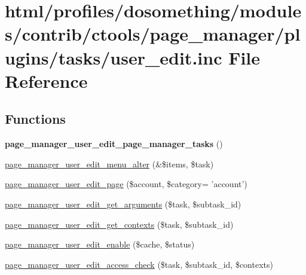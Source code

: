 \hypertarget{page__manager_2plugins_2tasks_2user__edit_8inc}{
\section{html/profiles/dosomething/modules/contrib/ctools/page\_\-manager/plugins/tasks/user\_\-edit.inc File Reference}
\label{page__manager_2plugins_2tasks_2user__edit_8inc}
}
\subsection*{Functions}
\begin{DoxyCompactItemize}
\item 
\hypertarget{page__manager_2plugins_2tasks_2user__edit_8inc_a8797d6dc72d52669429c95da19e760a6}{
{\bfseries page\_\-manager\_\-user\_\-edit\_\-page\_\-manager\_\-tasks} ()}
\label{page__manager_2plugins_2tasks_2user__edit_8inc_a8797d6dc72d52669429c95da19e760a6}

\item 
\hyperlink{page__manager_2plugins_2tasks_2user__edit_8inc_a46396f0acbd06ad364b85eeb374fbf84}{page\_\-manager\_\-user\_\-edit\_\-menu\_\-alter} (\&\$items, \$task)
\item 
\hyperlink{page__manager_2plugins_2tasks_2user__edit_8inc_abbda6f20e41f20d21543a539cbdb907f}{page\_\-manager\_\-user\_\-edit\_\-page} (\$account, \$category= 'account')
\item 
\hyperlink{page__manager_2plugins_2tasks_2user__edit_8inc_a3df388f9ce4f5d83b302a54261a83e8f}{page\_\-manager\_\-user\_\-edit\_\-get\_\-arguments} (\$task, \$subtask\_\-id)
\item 
\hyperlink{page__manager_2plugins_2tasks_2user__edit_8inc_a3c42b9d145a377d9575194d0bfb10851}{page\_\-manager\_\-user\_\-edit\_\-get\_\-contexts} (\$task, \$subtask\_\-id)
\item 
\hyperlink{page__manager_2plugins_2tasks_2user__edit_8inc_ac1cbd172da63121ed916e9923d27882a}{page\_\-manager\_\-user\_\-edit\_\-enable} (\$cache, \$status)
\item 
\hyperlink{page__manager_2plugins_2tasks_2user__edit_8inc_ab50a9d4e709806fca20037b4ef199fa3}{page\_\-manager\_\-user\_\-edit\_\-access\_\-check} (\$task, \$subtask\_\-id, \$contexts)
\end{DoxyCompactItemize}


